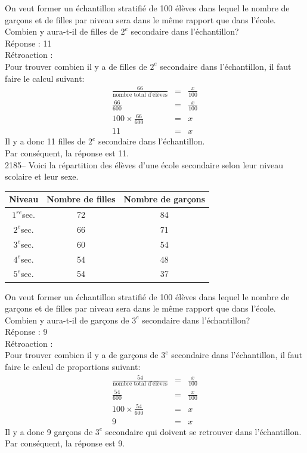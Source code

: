 \documentclass[letterpaper, 12pt]{article}
\begin{document}
On veut former un \'echantillon stratifi\'e de 100 \'el\`eves dans lequel le nombre de gar\c cons et de filles par niveau sera dans le m\^eme rapport que dans l'\'ecole. Combien y aura-t-il de filles de $2^{e}$ secondaire dans l'\'echantillon?\\

R\'eponse : 11\\

R\'etroaction :\\
Pour trouver combien il y a de filles de $2^{e}$ secondaire dans l'\'echantillon, il faut faire le calcul suivant:
\begin{eqnarray*}
 \frac{66}{\textrm{nombre total d'\'el\`eves}}&=&\frac{x}{100}\\[2mm]
 \frac{66}{600}&=&\frac{x}{100}\\[2mm]
 100\times \frac{66}{600}&=&x\\[2mm]
11 &=& x
\end{eqnarray*}
Il y a donc 11 filles de $2^{e}$ secondaire dans l'\'echantillon.\\
Par cons\'equent, la r\'eponse est 11.\\

2185-- Voici la r\'epartition des \'el\`eves d'une \'ecole secondaire selon leur niveau scolaire et leur sexe.\\
\begin{center}
 \begin{tabular}{|c|c|c|}\hline
 Niveau & Nombre de filles & Nombre de gar\c cons \\ \hline\hline
$1^{re}$sec. & 72 & 84 \\ \hline
$2^{e}$sec. & 66 & 71 \\ \hline
$3^{e}$sec. & 60 & 54 \\ \hline
$4^{e}$sec. & 54 & 48 \\ \hline
$5^{e}$sec. & 54 & 37 \\ \hline
\end{tabular}
\end{center}
On veut former un \'echantillon stratifi\'e de 100 \'el\`eves dans lequel le nombre de gar\c cons et de filles par niveau sera dans le m\^eme rapport que dans l'\'ecole. Combien y aura-t-il de gar\c cons de $3^{e}$ secondaire dans l'\'echantillon?\\

R\'eponse : 9\\

R\'etroaction :\\
Pour trouver combien il y a de gar\c cons de $3^{e}$ secondaire dans l'\'echantillon, il faut faire le calcul de proportions suivant:
\begin{eqnarray*}
 \frac{54}{\textrm{nombre total d'\'el\`eves}}&=&\frac{x}{100}\\[2mm]
 \frac{54}{600}&=&\frac{x}{100}\\[2mm]
 100\times \frac{54}{600}&=&x\\[2mm]
9 &=& x
\end{eqnarray*}
Il y a donc 9 gar\c cons de $3^{e}$ secondaire qui doivent se retrouver dans l'\'echantillon.\\
Par cons\'equent, la r\'eponse est 9.\\
\end{document}
